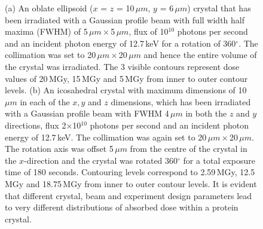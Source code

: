 \begin{figure}
{            (a) An oblate ellipsoid ($x$ = $z$ = 10\,$\mu m$, $y$ = 6\,$\mu m$) crystal that has been irradiated with a Gaussian profile beam with full width half maxima (FWHM) of 5\,$\mu m \times $5\,$\mu m$, flux of 10$^{\text{10}}$ photons per second and an incident photon energy of 12.7\,keV for a rotation of 360$^{\circ}$.
            The collimation was set to 20\,$\mu m \times $20\,$\mu m$ and hence the entire volume of the crystal was irradiated.
            The 3 visible contours represent dose values of 20\,MGy, 15\,MGy and 5\,MGy from inner to outer contour levels.
            (b) An icosahedral crystal with maximum dimensions of 10\,$\mu m$ in each of the $x, y$ and $z$ dimensions, which has been irradiated with a Gaussian profile beam with FWHM 4\,$\mu m$ in both the $z$ and $y$ directions, flux 2$ \times $10$^{\text{10}}$ photons per second and an incident photon energy of 12.7\,keV.
            The collimation was again set to 20\,$\mu m \times $20\,$\mu m$.
            The rotation axis was offset 5\,$\mu m$ from the centre of the crystal in the $x$-direction and the crystal was rotated 360$^{\circ}$ for a total exposure time of 180 seconds.
            Contouring levels correspond to 2.59\,MGy, 12.5\,MGy and 18.75\,MGy from inner to outer contour levels.
            It is evident that different crystal, beam and experiment design parameters lead to very different distributions of absorbed dose within a protein crystal.}
            \label{fig:RADDOSE-3D Polyhedral Crystal Examples}
        \end{figure}

